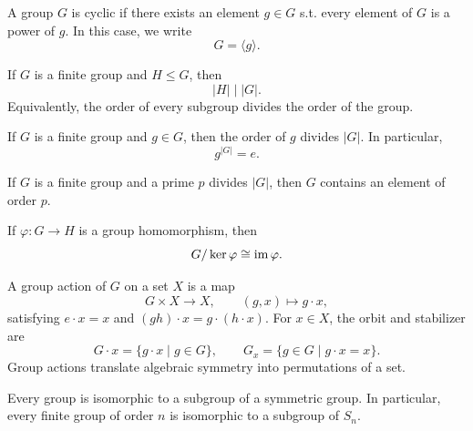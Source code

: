     \begin{definition}
        A group $G$ is cyclic if there exists an element $g\in G$ s.t. every
        element of $G$ is a power of $g$. In this case, we write
        \[
            G=\langle g\rangle.
        \]
    \end{definition}

    \begin{theorem}
        If $G$ is a finite group and $H\leq G$, then
        \[
            |H|\mid |G|.
        \]
        Equivalently, the order of every subgroup divides the order of the group.
    \end{theorem}

    \begin{corollary}
        If $G$ is a finite group and $g\in G$, then the order of $g$ divides
        $|G|$. In particular,
        \[
            g^{|G|}=e.
        \]
    \end{corollary}

    \begin{theorem}
        If $G$ is a finite group and a prime $p$ divides $|G|$, then $G$ contains
        an element of order $p$.
    \end{theorem}

    \begin{theorem}
        If $\varphi:G\to H$ is a group homomorphism, then
        \[
            G/\ker\varphi\cong \operatorname{im}\varphi.
        \]
    \end{theorem}

    \begin{definition}
        A group action of $G$ on a set $X$ is a map
        \[
            G\times X\to X,
            \qquad
            (g,x)\mapsto g\cdot x,
        \]
        satisfying $e\cdot x=x$ and $(gh)\cdot x=g\cdot(h\cdot x)$. For
        $x\in X$, the orbit and stabilizer are
        \[
            G\cdot x=\{g\cdot x\mid g\in G\},
            \qquad
            G_x=\{g\in G\mid g\cdot x=x\}.
        \]
        Group actions translate algebraic symmetry into permutations of a set.
    \end{definition}

    \begin{theorem}
        Every group is isomorphic to a subgroup of a symmetric group. In
        particular, every finite group of order $n$ is isomorphic to a subgroup
        of $S_n$.
    \end{theorem}


